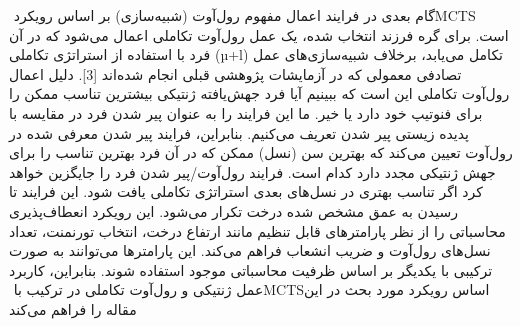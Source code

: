 \documentclass[11pt]{article}
\begin{document}
\begin{multicols}{2}
		گام بعدی در فرایند اعمال مفهوم رول‌آوت (شبیه‌سازی) بر اساس ‏رویکرد ‏MCTS‏ است. برای گره فرزند انتخاب شده، یک عمل رول‌آوت ‏تکاملی اعمال می‌شود که در آن فرد با استفاده از استراتژی تکاملی (‏‎µ+l‎‏) ‏تکامل می‌یابد، برخلاف شبیه‌سازی‌های عمل تصادفی معمولی که در ‏آزمایشات پژوهشی قبلی انجام شده‌اند [3]. دلیل اعمال رول‌آوت تکاملی ‏این است که ببینیم آیا فرد جهش‌یافته ژنتیکی بیشترین تناسب ممکن را ‏برای فنوتیپ خود دارد یا خیر. ما این فرایند را به عنوان پیر شدن فرد در ‏مقایسه با پدیده زیستی پیر شدن تعریف می‌کنیم. بنابراین، فرایند پیر شدن ‏معرفی شده در رول‌آوت تعیین می‌کند که بهترین سن (نسل) ممکن که ‏در آن فرد بهترین تناسب را برای جهش ژنتیکی مجدد دارد کدام است. ‏فرایند رول‌آوت/پیر شدن فرد را جایگزین خواهد کرد اگر تناسب بهتری در ‏نسل‌های بعدی استراتژی تکاملی یافت شود.‏
		این فرایند تا رسیدن به عمق مشخص شده درخت تکرار می‌شود. ‏این رویکرد انعطاف‌پذیری محاسباتی را از نظر پارامترهای قابل تنظیم ‏مانند ارتفاع درخت، انتخاب تورنمنت، تعداد نسل‌های رول‌آوت و ضریب ‏انشعاب فراهم می‌کند. این پارامترها می‌توانند به صورت ترکیبی با یکدیگر ‏بر اساس ظرفیت محاسباتی موجود استفاده شوند. بنابراین، کاربرد عمل ‏ژنتیکی و رول‌آوت تکاملی در ترکیب با ‏MCTS‏ اساس رویکرد مورد ‏بحث در این مقاله را فراهم می‌کند
		

\end{multicols}
\end{document}
